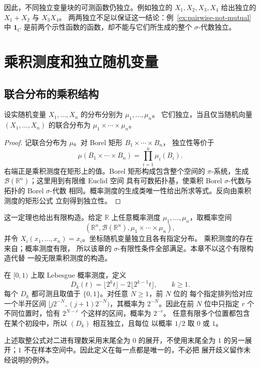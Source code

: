 因此，不同独立变量块的可测函数仍独立。例如独立的
$X_1,X_2,X_3,X_4$ 给出独立的 $X_1+X_2$ 与 $X_3X_4$。
两两独立不足以保证这一结论：例~\ref{ex:pairwise-not-mutual} 中
$\mathbf 1_C$ 是前两个示性函数的函数，却不能与它们所生成的整个
$\sigma$-代数独立。

\section{乘积测度和独立随机变量}
\label{sec:independence-product-laws}

\subsection{联合分布的乘积结构}

\begin{theorem}
\label{thm:independence-product-law}
设实随机变量 $X_1,\ldots,X_n$ 的分布分别为 $\mu_1,\ldots,\mu_n$。
它们独立，当且仅当随机向量 $(X_1,\ldots,X_n)$ 的联合分布为
$\mu_1\times\cdots\times\mu_n$。
\end{theorem}

\begin{proof}
记联合分布为 $\mu$。对 Borel 矩形 $B_1\times\cdots\times B_n$，
独立性等价于
\[
 \mu(B_1\times\cdots\times B_n)=\prod_{i=1}^n\mu_i(B_i).
\]
右端正是乘积测度在矩形上的值。Borel 矩形构成包含整个空间的
$\pi$-系统，生成 $\mathcal B(\mathbb R^n)$；这里用到有限维 Euclid 空间
具有可数拓扑基，使乘积 Borel $\sigma$-代数与拓扑的 Borel $\sigma$-代数
相同。概率测度的生成类唯一性给出所求等式。反向由乘积测度的矩形公式
立刻得到独立性。
\end{proof}

这一定理也给出有限构造。给定 $\mathbb R$ 上任意概率测度
$\mu_1,\ldots,\mu_n$，取概率空间
\[
 (\mathbb R^n,\mathcal B(\mathbb R^n),\mu_1\times\cdots\times\mu_n),
\]
并令 $X_i(x_1,\ldots,x_n)=x_i$。坐标随机变量独立且各有指定分布。
乘积测度的存在来自；概率测度有限，
所以该章的 $\sigma$-有限性条件全部满足。本章不以这个有限构造代替
一般无限乘积测度的构造。

\begin{example}[由二进制位构造独立序列]
\label{ex:independent-binary-digits}
在 $[0,1)$ 上取 Lebesgue 概率测度，定义
\[
 D_k(t)=\lfloor2^kt\rfloor-2\lfloor2^{k-1}t\rfloor,\qquad k\ge1.
\]
每个 $D_k$ 都可测且取值于 $\{0,1\}$。对任意 $N\ge1$，前 $N$ 位的
每个指定排列恰对应一个半开区间
$[j2^{-N},(j+1)2^{-N})$，其概率为 $2^{-N}$。因此在前 $N$ 位中只指定
$r$ 个不同位置时，恰有 $2^{N-r}$ 个这样的区间，概率为 $2^{-r}$。
任意有限多个位置都包含在某个初段中，所以 $(D_k)$ 相互独立，且每位
以概率 $1/2$ 取 $0$ 或 $1$。

上述取整公式对二进有理数采用末尾全为 $0$ 的展开，不使用末尾全为 $1$
的另一展开；$1$ 不在样本空间中。因此定义在每一点都是唯一的，不必把
展开歧义留作未经说明的例外。
\end{example}

